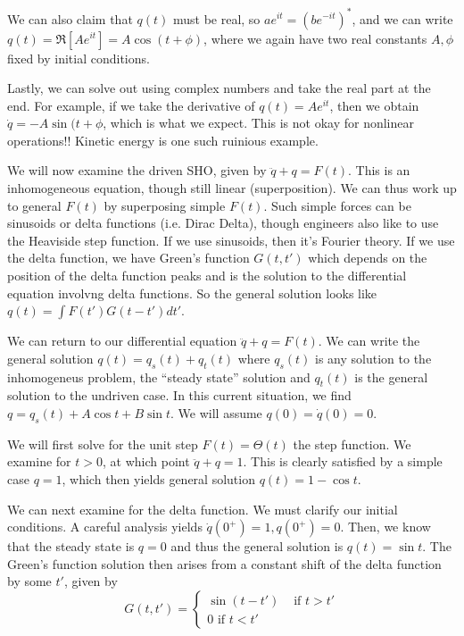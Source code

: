\documentclass[10pt]{report}
\begin{document}
We can also claim that $q(t)$ must be real, so $ae^{it} = \left( be^{-it} \right)^*$, and we can write $q(t) = \Re \left[ Ae^{it} \right] = A\cos\left( t + \phi \right)$, where we again have two real constants $A,\phi$ fixed by initial conditions. 

Lastly, we can solve out using complex numbers and take the real part at the end. For example, if we take the derivative of $q(t) = Ae^{it}$, then we obtain $\dot{q} = -A\sin (t + \phi$, which is what we expect. This is not okay for nonlinear operations!! Kinetic energy is one such ruinious example. 

We will now examine the driven SHO, given by $\ddot{q} + q = F(t)$. This is an inhomogeneous equation, though still linear (superposition). We can thus work up to general $F(t)$ by superposing simple $F(t)$. Such simple forces can be sinusoids or delta functions (i.e. Dirac Delta), though engineers also like to use the Heaviside step function. If we use sinusoids, then it's Fourier theory. If we use the delta function, we have Green's function $G(t,t')$ which depends on the position of the delta function peaks and is the solution to the differential equation involvng delta functions. So the general solution looks like $q(t) = \int F(t') G(t-t') dt'$.

We can return to our differential equation $\ddot{q} + q = F(t)$. We can write the general solution $q(t) = q_s(t) + q_t(t)$ where $q_s(t)$ is any solution to the inhomogeneus problem, the ``steady state'' solution and $q_t(t)$ is the general solution to the undriven case. In this current situation, we find $q = q_s(t) + A\cos t + B\sin t$. We will assume $q(0) = \dot{q}(0) = 0$. 

We will first solve for the unit step $F(t) = \Theta(t)$ the step function. We examine for $t > 0$, at which point $\ddot{q} + q = 1$. This is clearly satisfied by a simple case $q=1$, which then yields general solution $q(t) = 1 - \cos t$. 

We can next examine for the delta function. We must clarify our initial conditions. A careful analysis yields $\dot{q}(0^+) = 1, q(0^+) = 0$. Then, we know that the steady state is $q=0$ and thus the general solution is $q(t) = \sin t$. The Green's function solution then arises from a constant shift of the delta function by some $t'$, given by
$$G(t,t') = \begin{cases} \sin (t-t') &\mbox{ if } t>t'\\0 \mbox{ if } t < t'\end{cases}$$
\end{document}
